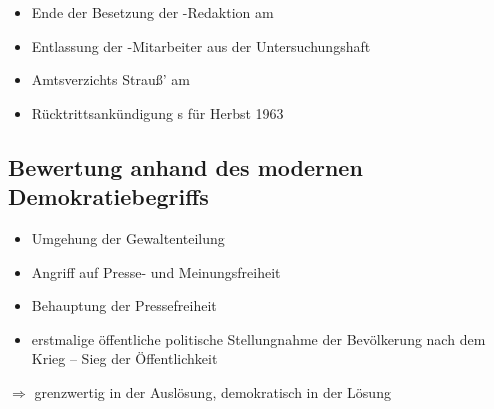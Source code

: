 \begin{itemize}
\item Ende der Besetzung der -Redaktion am 
\item Entlassung der -Mitarbeiter aus der
Untersuchungshaft
\item Amtsverzichts Strauß' am 
\item Rücktrittsankündigung s
für Herbst 1963
\end{itemize}


\subsection*{Bewertung anhand des modernen Demokratiebegriffs}

\begin{itemize}
\item Umgehung der Gewaltenteilung
\item Angriff auf Presse- und Meinungsfreiheit
\item Behauptung der Pressefreiheit
\item erstmalige öffentliche politische Stellungnahme der Bevölkerung
nach dem Krieg -- Sieg der Öffentlichkeit
\end{itemize}

$\Longrightarrow$ grenzwertig in der Auslösung, demokratisch in der
Lösung
